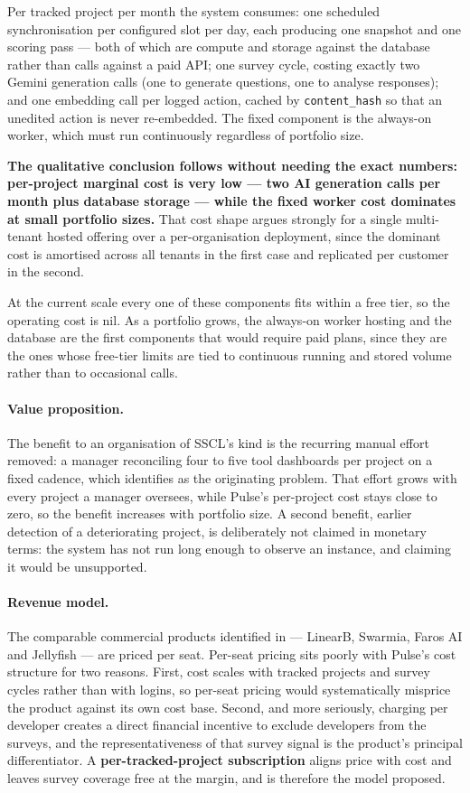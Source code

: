 Per tracked project per month the system consumes: one scheduled synchronisation
per configured slot per day, each producing one snapshot and one scoring
pass --- both of which are compute and storage against the database rather than
calls against a paid API; one survey cycle, costing exactly two Gemini
generation calls (one to generate questions, one to analyse responses); and one
embedding call per logged action, cached by \texttt{content\_hash} so that an
unedited action is never re-embedded. The fixed component is the always-on
worker, which must run continuously regardless of portfolio size.

\textbf{The qualitative conclusion follows without needing the exact numbers:
per-project marginal cost is very low --- two AI generation calls per month plus
database storage --- while the fixed worker cost dominates at small portfolio
sizes.} That cost shape argues strongly for a single multi-tenant hosted
offering over a per-organisation deployment, since the dominant cost is
amortised across all tenants in the first case and replicated per customer in
the second.

At the current scale every one of these components fits within a free tier, so
the operating cost is nil. As a portfolio grows, the always-on worker hosting
and the database are the first components that would require paid plans, since
they are the ones whose free-tier limits are tied to continuous running and
stored volume rather than to occasional calls.

\paragraph{Value proposition.} The benefit to an organisation of SSCL's kind is
the recurring manual effort removed: a manager reconciling four to five tool
dashboards per project on a fixed cadence, which  identifies as
the originating problem. That effort grows with every project a manager
oversees, while Pulse's per-project cost stays close to zero, so the benefit
increases with portfolio size. A second benefit, earlier detection of a
deteriorating project, is deliberately not claimed in monetary terms: the system
has not run long enough to observe an instance, and claiming it would be
unsupported.

\paragraph{Revenue model.} The comparable commercial products identified in
 --- LinearB, Swarmia, Faros AI and Jellyfish --- are priced
per seat. Per-seat pricing sits poorly with Pulse's cost structure for two
reasons. First, cost scales with tracked projects and survey cycles rather than
with logins, so per-seat pricing would systematically misprice the product
against its own cost base. Second, and more seriously, charging per developer
creates a direct financial incentive to exclude developers from the surveys, and
the representativeness of that survey signal is the product's principal
differentiator. A \textbf{per-tracked-project subscription} aligns price with
cost and leaves survey coverage free at the margin, and is therefore the model
proposed.

